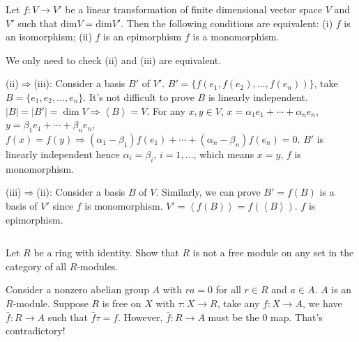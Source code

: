 $$ $$

\begin{ex}
    Let $f:V\to V'$ be a linear transformation of finite dimensional vector space $V$ and $V'$ such that $\mathrm{dim}V=\mathrm{dim}V'$. Then the following conditions are equivalent: (i) $f$ is an isomorphism; (ii) $f$ is an epimorphism $f$ is a monomorphism.
\end{ex}

\begin{answer}
    We only need to check (ii) and (iii) are equivalent.

    (ii)$\Rightarrow$(iii): Consider a basis $B'$ of $V'$. $B'=\{f(e_{1},f(e_{2}),\dots, f(e_{n}))\}$, take $B=\{e_{1},e_{2},\dots, e_{n}\}$. It's not difficult to prove $B$ is linearly independent. $\left| B \right|=\left| B' \right| =\dim V\Rightarrow \left\langle B\right\rangle=V$. For any $x,y\in V$, $x=\alpha_{1}e_{1}+\cdots+\alpha_{n}e_{n}$, $y=\beta_{1}e_{1}+\cdots+\beta_{n}e_{n}$, $f(x)=f(y)\Rightarrow (\alpha_{1}-\beta_{1})f(e_{1})+\cdots+(\alpha_{n}-\beta_{n})f(e_{n})=0$. $B'$ is linearly independent hence $\alpha_{i}=\beta_{i}$, $i=1,\dots$, which means $x=y$, $f$ is monomorphism.

    (iii)$\Rightarrow$(ii): Consider a basis $B$ of $V$. Similarly, we can prove $B'=f(B)$ is a basis of $V'$ since $f$ is monomorphism. $V'=\left\langle f(B)\right\rangle=f(\left\langle B\right\rangle)$. $f$ is epimorphism.
\end{answer}

$$ $$

\begin{ex}
    Let $R$ be a ring with identity. Show that $R$ is not a free module on any set in the category of all $R$-modules.
\end{ex}

\begin{answer}
    Consider a nonzero abelian group $A$ with $ra=0$ for all $r\in R$ and $a\in A$. $A$ is an $R$-module. Suppose $R$ is free on $X$ with $\tau:X\to R$, take any $f:X\to A$, we have $\bar{f}:R\to A$ such that $\bar{f}\tau=f$. However, $\bar{f}:R\to A$ must be the 0 map. That's contradictory!
\end{answer}